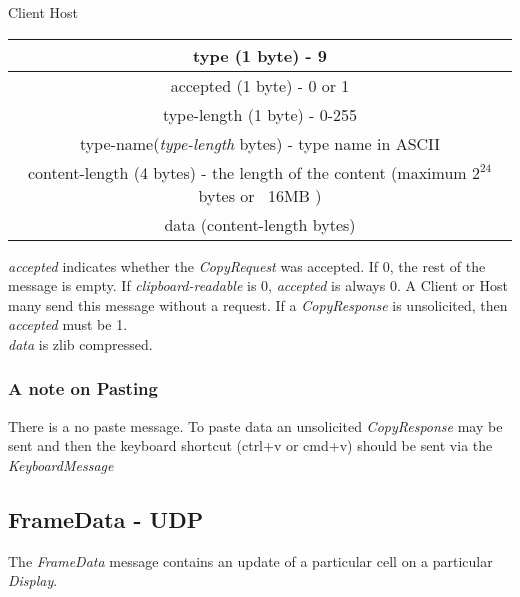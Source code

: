 \documentclass{article}
\begin{document}
    \begin{center}
        Client \leftrightarrow Host\\
        \begin{tabular}{|c|}
            \hline
            type (1 byte) - 9                                                                       \\
            \hline
            accepted (1 byte) - 0 or 1                                                              \\
            \hline
            type-length (1 byte) - 0-255                                                            \\
            \hline
            type-name(\emph{type-length} bytes) - type name in ASCII                                \\
            \hline
            content-length (4 bytes) - the length of the content (maximum $2^{24}$ bytes or ~16MB ) \\
            \hline
            data (content-length bytes)                                                             \\
            \hline
        \end{tabular}
    \end{center}

    \emph{accepted} indicates whether the \emph{CopyRequest} was accepted. If 0, the rest of the message is empty.
    If \emph{clipboard-readable} is 0, \emph{accepted} is always 0. A Client or Host many send this message without a request.
    If a \emph{CopyResponse} is unsolicited, then \emph{accepted} must be 1.\\

    \emph{data} is zlib compressed.

    \subsubsection{A note on Pasting}

    There is a no paste message. To paste data an unsolicited \emph{CopyResponse} may be sent and then the keyboard
    shortcut (ctrl+v or cmd+v) should be sent via the \emph{KeyboardMessage}

    \subsection{FrameData - UDP}
    The \emph{FrameData} message contains an update of a particular cell on a particular \emph{Display}.
\end{document}

